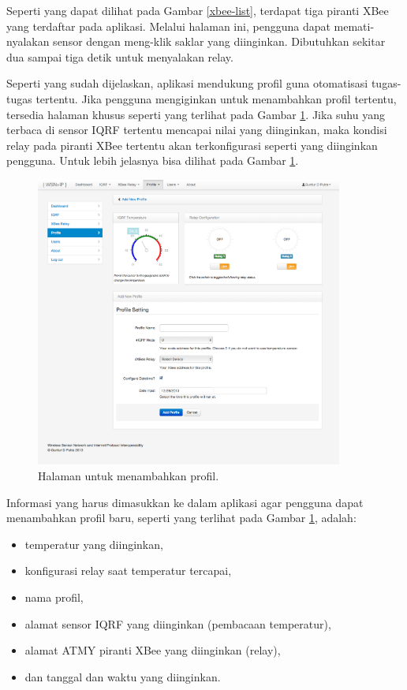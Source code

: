 			Seperti yang dapat dilihat pada Gambar \ref{xbee-list}, terdapat tiga piranti XBee yang terdaftar pada aplikasi. Melalui halaman ini, pengguna dapat memati-nyalakan sensor dengan meng-klik saklar yang diinginkan. Dibutuhkan sekitar dua sampai tiga detik untuk menyalakan relay.

			Seperti yang sudah dijelaskan, aplikasi mendukung profil guna otomatisasi tugas-tugas tertentu. Jika pengguna mengiginkan untuk menambahkan profil tertentu, tersedia halaman khusus seperti yang terlihat pada Gambar \ref{profile-add}. Jika suhu yang terbaca di sensor IQRF tertentu mencapai nilai yang diinginkan, maka kondisi relay pada piranti XBee tertentu akan terkonfigurasi seperti yang diinginkan pengguna. Untuk lebih jelasnya bisa dilihat pada Gambar \ref{profile-add}.

				\begin{figure}[H]
				  \centering
				    \includegraphics[width=0.9\textwidth]{gambar/profile-add}
				    \caption{Halaman untuk menambahkan profil.}
				    \label{profile-add}
				\end{figure}

			Informasi yang harus dimasukkan ke dalam aplikasi agar pengguna dapat menambahkan profil baru, seperti yang terlihat pada Gambar \ref{profile-add}, adalah:

				\begin{itemize}
					\item temperatur yang diinginkan,
					\item konfigurasi relay saat temperatur tercapai,
					\item nama profil,
					\item alamat sensor IQRF yang diinginkan (pembacaan temperatur),
					\item alamat ATMY piranti XBee yang diinginkan (relay),
					\item dan tanggal dan waktu yang diinginkan.
				\end{itemize}

